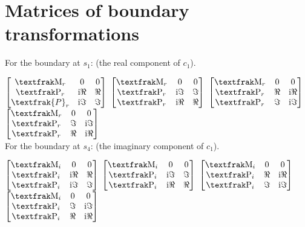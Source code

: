 \documentclass[]{iucr}              %
\numberwithin{equation}{section}
\begin{document}
	\section{Matrices of boundary transformations}
	
	For the boundary at $s_1$: (the real component of $c_1$).
	
	$\begin{bmatrix}
	\Minus{}_r & 0 & 0 \\
	\Plus{}_r &  \textrm{i}\Re{} & \Re{} \\
	\textfrak{P}_r & \textrm{i}\Im{} & \Im{}
	\end{bmatrix}$
	$\begin{bmatrix}
	\Minus{}_r & 0 & 0 \\
	\Plus{}_r &\textrm{i}\Im{} & \Im{} \\
	\Plus{}_r & \textrm{i}\Re{} & \Re{} \\
	\end{bmatrix}$ 
	$\begin{bmatrix}
	\Minus{}_r & 0 & 0 \\
	\Plus{}_r &  \Re{} & \textrm{i}\Re{} \\
	\Plus{}_r & \Im{} &\textrm{i}\Im{}
	\end{bmatrix}	$
	$\begin{bmatrix}
	\Minus{}_r & 0 & 0 \\
	\Plus{}_r & \Im{} &\textrm{i}\Im{} \\
	\Plus{}_r &  \Re{} &\textrm{i}\Re{} \\
	\end{bmatrix}$ \\
	
	For the boundary at $s_4$: (the imaginary component of $c_1$).
	
	$\begin{bmatrix}
	\Minus{}_i & 0 & 0 \\
	\Plus{}_i &  \textrm{i}\Re{} & \Re{} \\
	\Plus{}_i & \textrm{i}\Im{} & \Im{}
	\end{bmatrix}$
	$\begin{bmatrix}
	\Minus{}_i & 0 & 0 \\
	\Plus{}_i & \textrm{i}\Im{} & \Im{} \\
	\Plus{}_i &  \textrm{i}\Re{} & \Re{} \\
	\end{bmatrix}$ 
	$\begin{bmatrix}
	\Minus{}_i & 0 & 0 \\
	\Plus{}_i &  \Re{} & \textrm{i}\Re{} \\
	\Plus{}_i & \Im{} & \textrm{i}\Im{}
	\end{bmatrix}	$
	$\begin{bmatrix}
	\Minus{}_i & 0 & 0 \\
	\Plus{}_i & \Im{} & \textrm{i}\Im{} \\
	\Plus{}_i &  \Re{}& \textrm{i}\Re{} \\
	\end{bmatrix}$ \\
	
\end{document}
